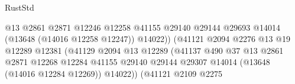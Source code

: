\begin{lexlean}{RustStd}
\begin{coremodule}
                                                        @13
                                                        @2861
                                                        @2871
                                                        @12246
                                                        @12258
                                                        @41155
                                                        @29140
                                                        @29144
                                                        @29693
                                                        @14014
                                                        (@13648 (@14016 @12258 @12247))
                                                        @14022))
                                                    (@41121
                                                      @2094
                                                      @2276
                                                      @13
                                                      @19
                                                      @12289
                                                      @12381
                                                      (@41129
                                                        @2094
                                                        @13
                                                        @12289
                                                        (@41137
                                                          @490
                                                          @37
                                                          @13
                                                          @2861
                                                          @2871
                                                          @12268
                                                          @12284
                                                          @41155
                                                          @29140
                                                          @29144
                                                          @29307
                                                          @14014
                                                          (@13648 (@14016 @12284 @12269))
                                                          @14022))
                                                      (@41121
                                                        @2109
                                                        @2275

\end{coremodule}
\end{lexlean}
